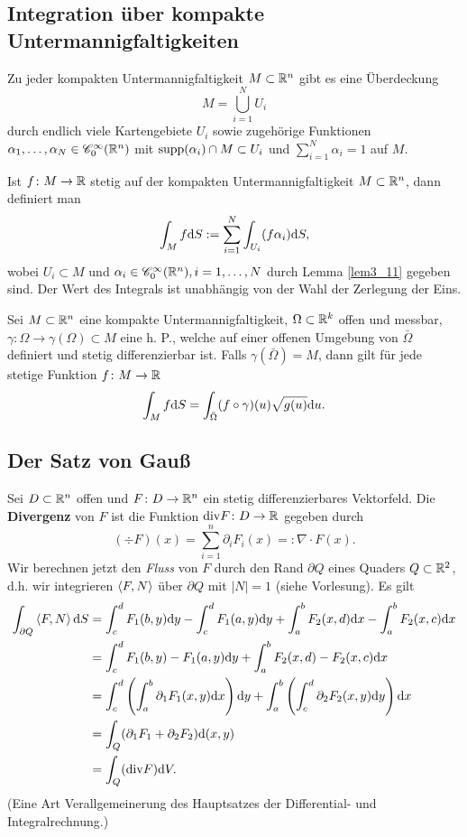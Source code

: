 \subsection{Integration über kompakte Untermannigfaltigkeiten}
\begin{lem}\label{lem3_11}
	Zu jeder kompakten Untermannigfaltigkeit $M \subset \mathbb{R}^n$ gibt es eine Überdeckung 
	\[M = \bigcup_{i=1}^N U_i\]
	durch endlich viele Kartengebiete $U_i$ sowie zugehörige Funktionen $\alpha_1, \dots, \alpha_N \in \mathscr{C}_0^\infty (\mathbb{R}^n)$ mit $\mathrm{supp}(\alpha_i) \cap M \subset U_i$ und $\sum_{i=1}^N \alpha_i = 1$ auf $M$.
\end{lem}
Ist $f \colon M \to \mathbb{R}$ stetig auf der kompakten Untermannigfaltigkeit $M \subset \mathbb{R}^n$, dann definiert man
\[\int_M f \mathrm{d} S := \sum_{i=1}^N \int_{U_i} (f \alpha_i) \mathrm{d} S,\]
wobei $U_i \subset M$ und $\alpha_i \in \mathscr{C}_0^\infty (\mathbb{R}^n), i = 1, \dots, N$ durch Lemma \ref{lem3_11} gegeben sind. Der Wert des Integrals ist unabhängig von der Wahl der Zerlegung der Eins.
\begin{satz}\label{satz3_12}
	Sei $M \subset \mathbb{R}^n$ eine kompakte Untermannigfaltigkeit, $\Omega \subset \mathbb{R}^k$ offen und messbar, $\gamma \colon \Omega \to \gamma(\Omega) \subset M$ eine h. P., welche auf einer offenen Umgebung von $\bar{\Omega}$ definiert und stetig differenzierbar ist. Falls $\gamma(\bar{\Omega}) = M$, dann gilt für jede stetige Funktion $f \colon M \to \mathbb{R}$
	\[\int_M f \mathrm{d} S = \int_{\bar{\Omega}} (f \circ \gamma)(u) \sqrt{g(u)} \mathrm{d} u.\]
\end{satz}

\subsection{Der Satz von Gauß}
Sei $D \subset \mathbb{R}^n$ offen und $F \colon D \to \mathbb{R}^n$ ein stetig differenzierbares Vektorfeld. Die \textbf{Divergenz} von $F$ ist die Funktion $\mathrm{div} F \colon D \to \mathbb{R}$ gegeben durch
\[(\div F)(x) = \sum_{i=1}^n \partial_i F_i(x) =: \nabla \cdot F(x).\]
Wir berechnen jetzt den \textit{Fluss} von $F$ durch den Rand $\partial Q$ eines Quaders $Q \subset \mathbb{R}^2$, d.h. wir integrieren $\left\langle F,N \right\rangle$ über $\partial Q$ mit $|N| = 1$ (siehe Vorlesung). Es gilt
\begin{align*}
	\int_{\partial Q} \left\langle F,N \right\rangle \mathrm{d} S &= \int_c^d F_1(b,y) \mathrm{d} y - \int_c^d F_1(a,y) \mathrm{d} y + \int_a^b F_2(x,d) \mathrm{d} x - \int_a^b F_2(x,c) \mathrm{d} x\\
	&= \int_c^d F_1(b,y) - F_1(a,y) \mathrm{d} y + \int_a^b F_2(x,d) - F_2(x,c) \mathrm{d} x\\
	&= \int_c^d \left(\int_a^b \partial_1 F_1(x,y) \mathrm{d} x\right) \mathrm{d} y + \int_a^b \left(\int_c^d \partial_2 F_2(x,y) \mathrm{d} y\right) \mathrm{d} x\\
	&= \int_Q (\partial_1 F_1 + \partial_2 F_2) \mathrm{d}(x,y)\\
	&= \int_Q (\mathrm{div} F) \mathrm{d} V.
\end{align*}
(Eine Art Verallgemeinerung des Hauptsatzes der Differential- und Integralrechnung.)


